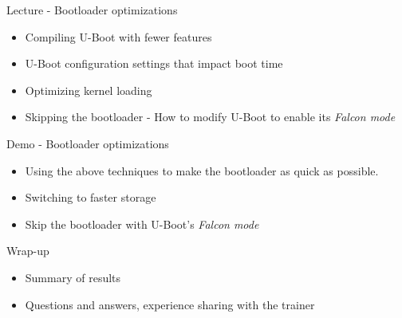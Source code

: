 \documentclass[a4paper,12pt,obeyspaces,spaces,hyphens]{article}
\begin{document}
\feagendatwocolumn
{Lecture - Bootloader optimizations}
{
  \begin{itemize}
  \item Compiling U-Boot with fewer features
  \item U-Boot configuration settings that impact boot time
  \item Optimizing kernel loading
  \item Skipping the bootloader - How to modify U-Boot to
        enable its {\em Falcon mode}
  \end{itemize}
}
{Demo - Bootloader optimizations}
{
 \begin{itemize}
 \item Using the above techniques to make the bootloader
    as quick as possible.
 \item Switching to faster storage
 \item Skip the bootloader with U-Boot's {\em Falcon mode}
 \end{itemize}
}

\feagendaonecolumn
{Wrap-up}
{
 \begin{itemize}
 \item Summary of results
 \item Questions and answers, experience sharing with the trainer
 \end{itemize}
}
\end{document}
